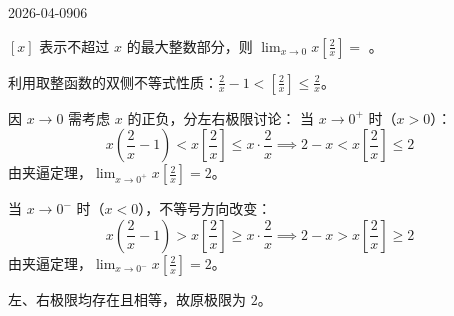 \begin{mistake}{2026-04-09}{06}

\begin{problemcontent}
\( [x] \) 表示不超过 \( x \) 的最大整数部分，则 \( \lim_{x \to 0} x \left[ \frac{2}{x} \right] = \) \underline{\hspace{2em}}。
\end{problemcontent}

\begin{solutioncontent}
利用取整函数的双侧不等式性质：\(\frac{2}{x} - 1 < \left[ \frac{2}{x} \right] \leq \frac{2}{x}\)。

因 \(x \to 0\) 需考虑 \(x\) 的正负，分左右极限讨论：
当 \(x \to 0^+\) 时（\(x > 0\)）：
\[ x\left(\frac{2}{x} - 1\right) < x\left[ \frac{2}{x} \right] \leq x \cdot \frac{2}{x} \implies 2 - x < x\left[ \frac{2}{x} \right] \leq 2 \]
由夹逼定理，\(\lim_{x \to 0^+} x \left[ \frac{2}{x} \right] = 2\)。

当 \(x \to 0^-\) 时（\(x < 0\)），不等号方向改变：
\[ x\left(\frac{2}{x} - 1\right) > x\left[ \frac{2}{x} \right] \geq x \cdot \frac{2}{x} \implies 2 - x > x\left[ \frac{2}{x} \right] \geq 2 \]
由夹逼定理，\(\lim_{x \to 0^-} x \left[ \frac{2}{x} \right] = 2\)。

左、右极限均存在且相等，故原极限为 \(2\)。
\end{solutioncontent}


\end{mistake}
